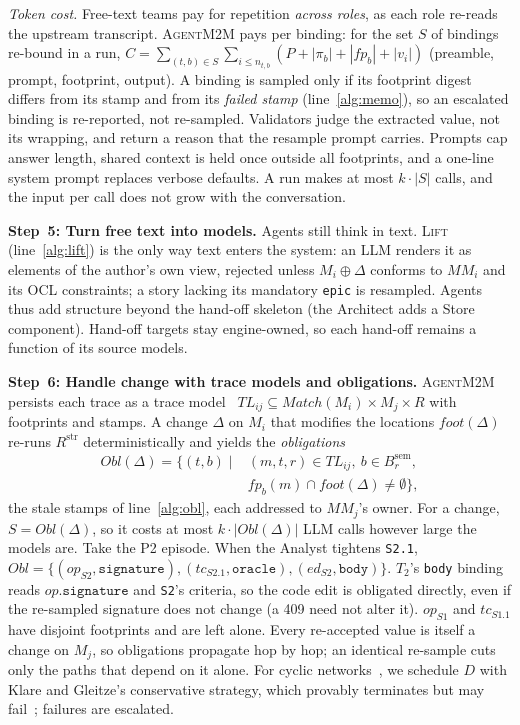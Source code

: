 \documentclass[10pt,conference]{IEEEtran}
\theoremstyle{definition}
\newcommand{\tool}{\textsc{AgentM2M}}
\newcommand{\MM}{\mathit{MM}}
\newcommand{\TL}{\mathit{TL}}
\newcommand{\str}{\mathrm{str}}
\newcommand{\sem}{\mathrm{sem}}
\newcommand{\cls}[1]{\textsf{#1}}
\newcommand{\code}[1]{\texttt{#1}}
\newcommand{\fp}{\mathit{fp}}
\newcommand{\Obl}{\mathit{Obl}}
\begin{document}
\emph{Token cost.} Free-text teams pay for repetition \emph{across roles},
as each role re-reads the upstream transcript. \tool{} pays per binding:
for the set $S$ of bindings re-bound in a run,
$C=\sum_{(t,b)\in S}\sum_{i\le n_{t,b}}(P+|\pi_b|+|\fp_b|+|v_i|)$
(preamble, prompt, footprint, output). A binding is sampled only if its
footprint digest differs from its stamp and from its \emph{failed stamp}
(line~\ref{alg:memo}), so an escalated binding is re-reported, not
re-sampled. Validators judge the extracted value, not its wrapping, and
return a reason that the resample prompt carries. Prompts cap answer
length, shared context is held once outside all footprints, and a one-line
system prompt replaces verbose defaults. A run makes at most $k\cdot|S|$
calls, and the input per call does not grow with the conversation.

\smallskip\noindent\textbf{Step~5: Turn free text into models.} Agents
still think in text. \textsc{Lift} (line~\ref{alg:lift}) is the only way
text enters the system: an LLM renders it as elements of the author's own
view, rejected unless $M_i\oplus\Delta$ conforms to $\MM_i$ and its OCL
constraints; a story lacking its mandatory \code{epic} is resampled. Agents
thus add structure beyond the hand-off skeleton (the Architect adds a
\cls{Store} component). Hand-off targets stay engine-owned, so each
hand-off remains a function of its source models.

\smallskip\noindent\textbf{Step~6: Handle change with trace models and
obligations.} \tool{} persists each trace as a trace
model~\cite{vara2014metagem}
$\TL_{ij}\subseteq\mathit{Match}(M_i)\times M_j\times R$ with footprints
and stamps. A change $\Delta$ on $M_i$ that modifies the locations
$\mathit{foot}(\Delta)$ re-runs $R^{\str}$ deterministically and yields the
\emph{obligations}
\begin{align*}
\Obl(\Delta)=\{(t,b)\mid{}&(m,t,r)\in \TL_{ij},\ b\in B_r^{\sem},\\
  &\fp_b(m)\cap \mathit{foot}(\Delta)\neq\emptyset\},
\end{align*}
the stale stamps of line~\ref{alg:obl}, each addressed to $\MM_j$'s owner. For a change, $S=\Obl(\Delta)$, so it costs at most
$k\cdot|\Obl(\Delta)|$ LLM calls however large the models are. Take the P2
episode. When the Analyst tightens \code{S2.1},
$\Obl=\{(\mathit{op}_{S2},\code{signature}),
(\mathit{tc}_{S2.1},\code{oracle}), (\mathit{ed}_{S2},\code{body})\}$.
$T_2$'s \code{body} binding reads $\mathit{op}.\code{signature}$ and
\code{S2}'s criteria, so the code edit is obligated directly, even if the
re-sampled signature does not change (a 409 need not alter it).
$\mathit{op}_{S1}$ and $\mathit{tc}_{S1.1}$ have disjoint footprints and
are left alone. Every re-accepted value is itself a change on $M_j$, so
obligations propagate hop by hop; an identical re-sample cuts only the
paths that depend on it alone. For cyclic networks~\cite{stevens2020networks},
we schedule $D$ with Klare and Gleitze's conservative strategy, which
provably terminates but may fail~\cite{klare2023termination}; failures are
escalated.
\end{document}
